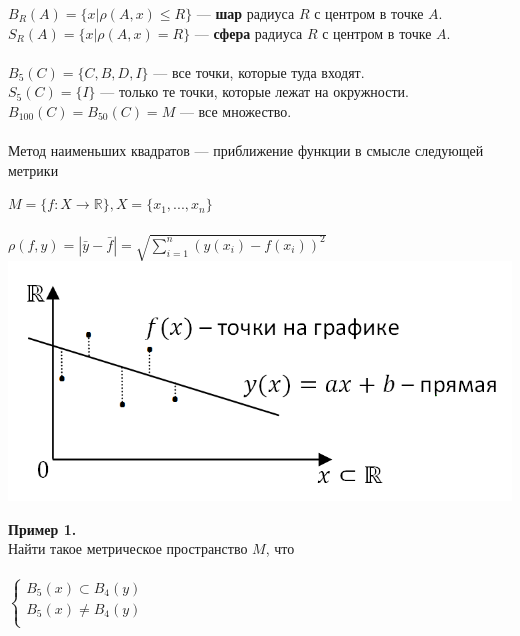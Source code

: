 \documentclass[12pt]{article}
\theoremstyle{definition}
\numberwithin{equation}{section}
\begin{document}
	$B_R(A) = \{x | \rho(A, x) \leqslant R \}$ --- \textbf{шар} радиуса $R$ с центром в точке $A$.\\ 
	$S_R(A) = \{x | \rho(A, x) = R \}$ --- \textbf{сфера} радиуса $R$ с центром в точке $A$.\\ 
	\\
	$B_5(C) = \{ C, B, D, I \}$ --- все точки, которые туда входят. \\
	$S_5(C) = \{ I \}$ --- только те точки, которые лежат на окружности. \\
	$B_{100}(C) = B_{50} (C) = M $ --- все множество. \\
	\\
	Метод наименьших квадратов --- приближение функции в смысле следующей метрики \begin{center} $M = \{f: X \rightarrow \mathbb{R} \}, X = \{ x_1, ..., x_n \}$\\ ~\\
		$\rho (f, y) = |\bar y - \bar f| = \sqrt{\sum\limits_{i=1}^n(y(x_i)-f(x_i))^2}$ \\
		\includegraphics[scale=0.6]{l4_4.png}\end{center}
	\noindent \textbf{Пример 1.}\\
	Найти такое метрическое пространство $M$, что\\ \\
	$  
	\left\{  
	\begin{array}{lcl}  
	B_5(x) \subset B_4(y) \\  
	B_5(x) \neq B_4(y)\\
	\end{array}   
	\right.  
	$
\end{document}
